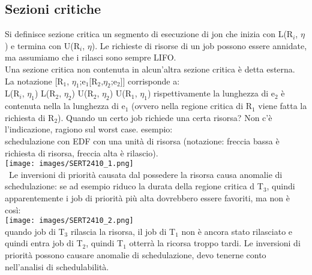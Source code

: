 \documentclass[18px]{article}
\begin{document}
\subsection{Sezioni critiche}
Si definisce sezione critica un segmento di esecuzione di jon che inizia con L(R$_{i}$, $\eta$) e termina con U(R$_{i}$, $\eta$). Le richieste di risorse di un job possono essere annidate, ma assumiamo che i rilasci sono sempre LIFO.\\ Una sezione critica non contenuta in alcun'altra sezione critica è detta esterna.\\ La notazione [R$_{1}$, $\eta_1$;e$_{1}$[R$_{2}$,$\eta_2$;e$_{2}$]] corrisponde a:\\ L(R$_{i}$, $\eta_1$) L(R$_{2}$, $\eta_2$) U(R$_{2}$, $\eta_2$) U(R$_{1}$, $\eta_1$) rispettivamente la lunghezza di e$_{2}$ è contenuta nella la lunghezza di e$_{1}$ (ovvero nella regione critica di R$_{1}$ viene fatta la richiesta di R$_{2}$). Quando un certo job richiede una certa risorsa? Non c'è l'indicazione, ragiono sul worst case. esempio:\\
schedulazione con EDF con una unità di risorsa (notazione: freccia bassa è richiesta di risorsa, freccia alta è rilascio).\\
\texttt{[image: images/SERT2410\_1.png]}\\\
Le inversioni di priorità causata dal possedere la risorsa causa anomalie di schedulazione: se ad esempio riduco la durata della regione critica d T$_{3}$, quindi apparentemente i job di priorità più alta dovrebbero essere favoriti, ma non è così:\\ 
\texttt{[image: images/SERT2410\_2.png]}\\
quando job di T$_{3}$ rilascia la risorsa, il job di T$_{1}$ non è ancora stato rilasciato e quindi entra job di T$_{2}$, quindi T$_{1}$ otterrà la ricorsa troppo tardi. Le inversioni di priorità possono causare anomalie di schedulazione, devo tenerne conto nell'analisi di schedulabilità.
\end{document}
